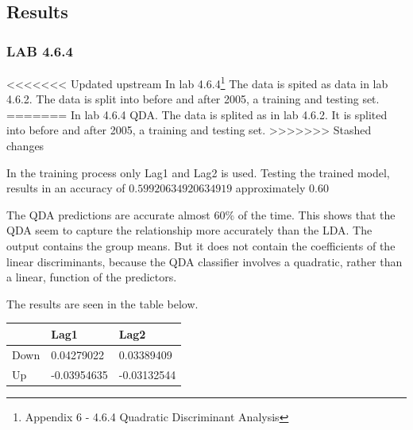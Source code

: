 \subsection{Results}
\subsubsection*{LAB 4.6.4}
<<<<<<< Updated upstream
In lab 4.6.4\footnote{Appendix 6 - 4.6.4 Quadratic Discriminant Analysis} The data is spited as data in lab 4.6.2. The data is split into before and after 2005, a training and testing set.
=======
In lab 4.6.4 QDA. The data is splited as in lab 4.6.2. It is splited into before and after 2005, a training and testing set.
>>>>>>> Stashed changes

In the training process only Lag1 and Lag2 is used. Testing the trained model, results in an accuracy of $0.59920634920634919$ approximately $0.60$

The QDA predictions are accurate almost $60\%$ of the time. This shows that the QDA seem to capture the relationship more accurately than the LDA. The output contains the group means. But it does not contain the coefficients of the linear discriminants, because the QDA classifier involves a quadratic, rather than a linear, function of the predictors.

The results are seen in the table below.

\begin{longtable}[]{@{}lll@{}}
	\toprule
	& Lag1 & Lag2\tabularnewline
	\midrule
	\endhead
	Down & 0.04279022 & 0.03389409\tabularnewline
	Up & -0.03954635 & -0.03132544\tabularnewline
	\bottomrule
\end{longtable}